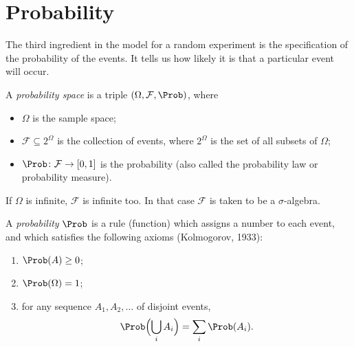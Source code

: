 \section{Probability}\label{sec:probability}

The third ingredient in the model for a random experiment is the specification of the probability of the events. It tells us how likely it is that a particular event will occur.

\begin{definition}\label{def:probability-space}
A \emph{probability space} is a triple $(\Omega, \mathcal{F}, \Prob)$, where
\begin{itemize}
  \item $\Omega$ is the sample space;
  \item $\mathcal{F} \subseteq 2^\Omega$ is the collection of events, where $2^\Omega$ is the set of all subsets of $\Omega$;
  \item $\Prob \colon \mathcal{F} \to [0, 1]$ is the probability (also called the probability law or probability measure).
\end{itemize}
\end{definition}

\begin{remark}
If $\Omega$ is infinite, $\mathcal{F}$ is infinite too. In that case $\mathcal{F}$ is taken to be a $\sigma$-algebra.
\end{remark}

\begin{definition}\label{def:probability-measure}
A \emph{probability} $\Prob$ is a rule (function) which assigns a number to each event, and which satisfies the following axioms (Kolmogorov, 1933):
\begin{enumerate}[label=\textbf{Axiom \arabic*:}, leftmargin=*, widest=3]
  \item $\Prob(A) \ge 0$;
  \item $\Prob(\Omega) = 1$;
  \item for any sequence $A_1, A_2, \ldots$ of disjoint events,
  \begin{equation}\label{eq:sum-rule}
    \Prob\Bigl(\bigcup_i A_i\Bigr) = \sum_i \Prob(A_i).
  \end{equation}
\end{enumerate}
\end{definition}

